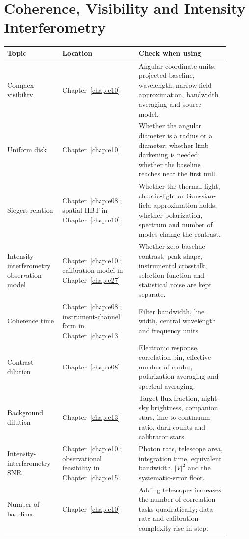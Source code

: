 \section{Coherence, Visibility and Intensity Interferometry}
\label{appsec:a-coherence}

\begin{longtable}{p{0.22\linewidth}p{0.31\linewidth}p{0.37\linewidth}}
\toprule
Topic & Location & Check when using \\
\midrule
Complex visibility & Chapter~\ref{chap:e10} & Angular-coordinate units, projected baseline, wavelength, narrow-field approximation, bandwidth averaging and source model. \\
Uniform disk & Chapter~\ref{chap:e10} & Whether the angular diameter is a radius or a diameter; whether limb darkening is needed; whether the baseline reaches near the first null. \\
Siegert relation & Chapter~\ref{chap:e08}; spatial HBT in Chapter~\ref{chap:e10} & Whether the thermal-light, chaotic-light or Gaussian-field approximation holds; whether polarization, spectrum and number of modes change the contrast. \\
Intensity-interferometry observation model & Chapter~\ref{chap:e10}; calibration model in Chapter~\ref{chap:e27} & Whether zero-baseline contrast, peak shape, instrumental crosstalk, selection function and statistical noise are kept separate. \\
Coherence time & Chapter~\ref{chap:e08}; instrument-channel form in Chapter~\ref{chap:e13} & Filter bandwidth, line width, central wavelength and frequency units. \\
Contrast dilution & Chapter~\ref{chap:e08} & Electronic response, correlation bin, effective number of modes, polarization averaging and spectral averaging. \\
Background dilution & Chapter~\ref{chap:e13} & Target flux fraction, night-sky brightness, companion stars, line-to-continuum ratio, dark counts and calibrator stars. \\
Intensity-interferometry SNR & Chapter~\ref{chap:e10}; observational feasibility in Chapter~\ref{chap:e15} & Photon rate, telescope area, integration time, equivalent bandwidth, \(|V|^2\) and the systematic-error floor. \\
Number of baselines & Chapter~\ref{chap:e10} & Adding telescopes increases the number of correlation tasks quadratically; data rate and calibration complexity rise in step. \\
\bottomrule
\end{longtable}

